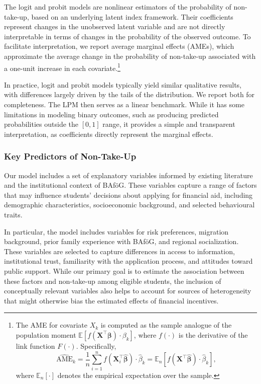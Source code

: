 The logit and probit models are nonlinear estimators of the probability of non-take-up, based on an underlying latent index framework. 
Their coefficients represent changes in the unobserved latent variable and are not directly interpretable in terms of changes in the probability of the observed outcome. 
To facilitate interpretation, we report average marginal effects (AMEs), which approximate the average change in the probability of non-take-up associated with a one-unit increase in each covariate.\footnote{The AME for covariate \( X_k \) is computed as the sample analogue of the population moment \( \mathbb{E}[f(\mathbf{X}^\top \boldsymbol{\beta}) \cdot \beta_k] \), where \( f(\cdot) \) is the derivative of the link function \( F(\cdot) \). Specifically,
\[
    \widehat{\text{AME}}_k 
    = \frac{1}{n} \sum_{i=1}^n f(\mathbf{X}_i^\top \hat{\boldsymbol{\beta}}) \cdot \hat{\beta}_k
    = \mathbb{E}_n \left[ f(\mathbf{X}^\top \hat{\boldsymbol{\beta}}) \cdot \hat{\beta}_k \right],
\]
where \( \mathbb{E}_n[\cdot] \) denotes the empirical expectation over the sample.}

In practice, logit and probit models typically yield similar qualitative results, with differences largely driven by the tails of the distribution. We report both for completeness. The LPM then serves as a linear benchmark. While it has some limitations in modeling binary outcomes, such as producing predicted probabilities outside the \([0,1]\) range, it provides a simple and transparent interpretation, as coefficients directly represent the marginal effects.

\subsubsection{Key Predictors of Non-Take-Up}
Our model includes a set of explanatory variables informed by existing literature and the institutional context of BAföG. 
These variables capture a range of factors that may influence students' decisions about applying for financial aid, including demographic characteristics, socioeconomic background, and selected behavioural traits. 

In particular, the model includes variables for risk preferences, migration background, prior family experience with BAföG, and regional socialization. These variables are selected to capture differences in access to information, institutional trust, familiarity with the application process, and attitudes toward public support. While our primary goal is to estimate the association between these factors and non-take-up among eligible students, the inclusion of conceptually relevant variables also helps to account for sources of heterogeneity that might otherwise bias the estimated effects of financial incentives.

